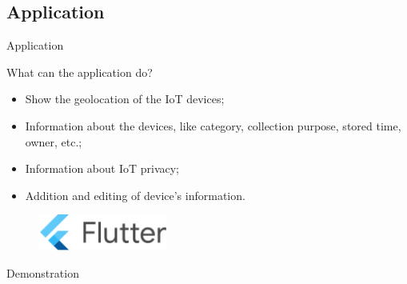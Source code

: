 \documentclass[xcolor={svgnames},compress,aspectratio=169]{beamer}
\begin{document}

\subsection{Application}

\begin{frame}{Application}
    \begin{multicols}{2}
        What can the application do?
        \begin{itemize}
            \item Show the geolocation of the IoT devices;
            \item Information about the devices, like category, collection purpose, stored time, owner, etc.;
            \item Information about IoT privacy;
            \item Addition and editing of device's information.
        \end{itemize}

        \columnbreak
        \begin{figure}
            \centering\includegraphics[width=120pt]{assets/images/flutter.png}
        \end{figure}
        \begin{figure}
            \centering
            
        \end{figure}
    \end{multicols}
\end{frame}


{
\begin{frame}
    \centering
    \vspace*{\fill}
    {\Large Demonstration}
    \vspace*{\fill}
\end{frame}
}
\end{document}
